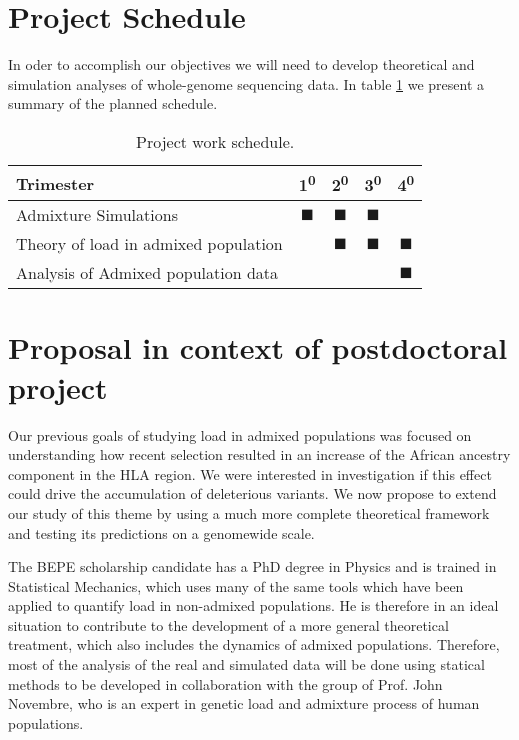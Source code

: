 \documentclass[a4paper, 12pt]{article}
\newcommand{\ts}{\textsuperscript}
\newcommand{\bs}{$\blacksquare$}
\begin{document}
\section{Project Schedule}

In oder to accomplish our objectives we will need to develop theoretical
and simulation analyses of whole-genome sequencing data. In table
\ref{tab:smallcalendar} we present a summary of the planned schedule. 


\begin{table}[ht]
    \centering
    \begin{tabular}{|l||c|c|c|c|}
      \hline
      Trimester & 1\ts0 & 2\ts0 & 3\ts0 & 4\ts0 \\ 
      \hline \hline
      Admixture Simulations & \bs & \bs & \bs &  \\ \hline
      Theory of load in admixed population  & &\bs  &\bs  &\bs  \\ \hline
      Analysis of Admixed population data & & & &\bs  \\
      \hline
    \end{tabular}
\caption{Project work schedule.}
\label{tab:smallcalendar}
\end{table}


\section{Proposal in context of postdoctoral project}

Our previous goals of studying  load in admixed populations was focused on
understanding how recent selection  resulted in an increase of the African
ancestry component in the HLA region. We were interested in investigation if
this effect could drive the accumulation of deleterious variants. We now
propose to extend our study of this theme by using a much more complete
theoretical framework and testing its predictions on a genomewide scale.    

The BEPE scholarship candidate has a  PhD degree in Physics and is trained in
Statistical Mechanics, which uses many of the same tools which have been
applied to quantify load in non-admixed populations. He is therefore in an
ideal situation to contribute to the development of a more general theoretical
treatment, which also includes the dynamics of admixed populations.  Therefore,
most of the analysis of the real and simulated data will be done using statical
methods to be developed in collaboration with the group of Prof. John Novembre,
who is an expert in genetic load and admixture process of human populations.  

\footnotesize
\twocolumn
\begin{spacing}{1}


\end{spacing}
\end{document}
